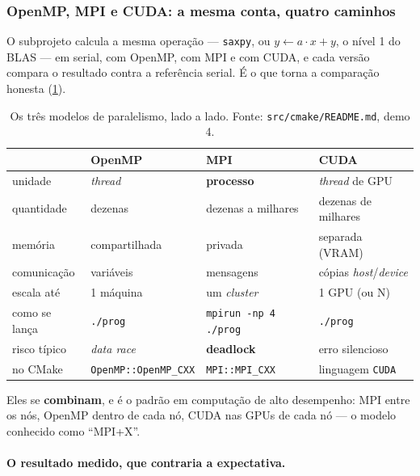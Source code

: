 \subsubsection{OpenMP, MPI e CUDA: a mesma conta, quatro caminhos}

O subprojeto calcula a mesma operação --- \texttt{saxpy}, ou
$y \leftarrow a \cdot x + y$, o nível 1 do BLAS --- em serial, com OpenMP, com
MPI e com CUDA, e cada versão compara o resultado contra a referência serial.
É o que torna a comparação honesta (\cref{tab:paralelismo}).

\begin{table}[htbp]
\centering
\caption{Os três modelos de paralelismo, lado a lado. Fonte:
         \texttt{src/cmake/README.md}, demo 4.}
\label{tab:paralelismo}
\footnotesize
\begin{tabular}{@{}llll@{}}
\toprule
 & \textbf{OpenMP} & \textbf{MPI} & \textbf{CUDA} \\
\midrule
unidade        & \emph{thread}   & \textbf{processo}      & \emph{thread} de GPU \\
quantidade     & dezenas         & dezenas a milhares     & dezenas de milhares \\
memória        & compartilhada   & privada                & separada (VRAM) \\
comunicação    & variáveis       & mensagens              & cópias \emph{host}/\emph{device} \\
escala até     & 1 máquina       & um \emph{cluster}      & 1 GPU (ou N) \\
como se lança  & \texttt{./prog} & \texttt{mpirun -np 4 ./prog} & \texttt{./prog} \\
risco típico   & \emph{data race}& \textbf{deadlock}      & erro silencioso \\
no CMake       & \texttt{OpenMP::OpenMP\_CXX} & \texttt{MPI::MPI\_CXX} & linguagem \texttt{CUDA} \\
\bottomrule
\end{tabular}
\end{table}

Eles se \textbf{combinam}, e é o padrão em computação de alto desempenho: MPI
entre os nós, OpenMP dentro de cada nó, CUDA nas GPUs de cada nó --- o modelo
conhecido como ``MPI+X''.

\paragraph{O resultado medido, que contraria a expectativa.}

